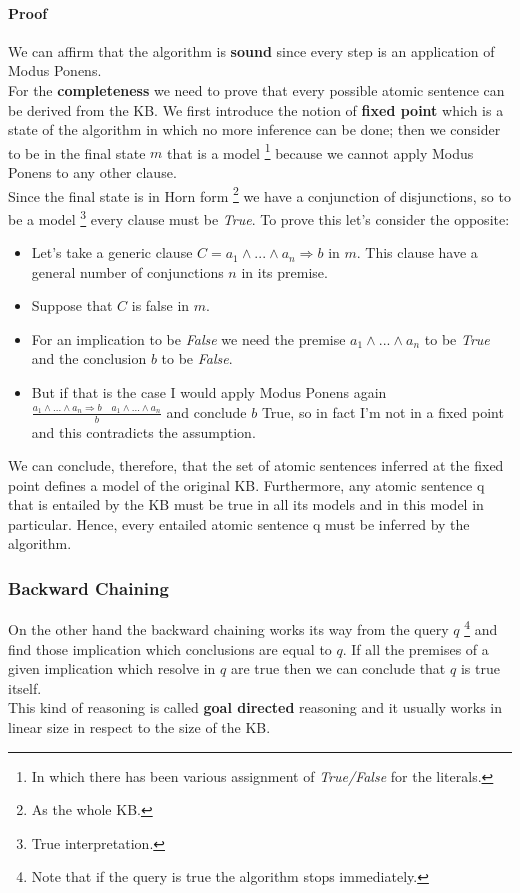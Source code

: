 \documentclass[10pt,a4paper]{article}
\begin{document}
\paragraph{Proof}
We can affirm that the algorithm is \textbf{sound} since every step is an application of Modus Ponens.\\
For the \textbf{completeness} we need to prove that every possible atomic sentence can be derived from the KB. We first introduce the notion of \textbf{fixed point} which is a state of the algorithm in which no more inference can be done; then we consider to be in the final state $m$ that is a model \footnote{In which there has been various assignment of \textit{True/False} for the literals.} because we cannot apply Modus Ponens to any other clause.\\
Since the final state is in Horn form \footnote{As the whole KB.} we have a conjunction of disjunctions, so to be a model \footnote{True interpretation.} every clause must be \textit{True}. To prove this let's consider the opposite:
\begin{itemize}
\item Let's take a generic clause $C=a_1\wedge...\wedge a_n\Rightarrow b$ in $m$. This clause have a general number of conjunctions $n$ in its premise.
\item Suppose that $C$ is false in $m$.
\item For an implication to be \textit{False} we need the premise $a_1\wedge...\wedge a_n$ to be \textit{True} and the conclusion $b$ to be \textit{False}.
\item But if that is the case I would apply Modus Ponens again $\frac{a_1\wedge...\wedge a_n\Rightarrow b\quad a_1\wedge...\wedge a_n}{b}$ and conclude $b$ True, so in fact I'm not in a fixed point and this contradicts the assumption.
\end{itemize}


We can conclude, therefore, that the set of atomic sentences inferred at the fixed point defines a model of the original KB. Furthermore, any atomic sentence q that is entailed by the KB must be true in all its models and in this model in particular. Hence, every entailed atomic sentence q must be inferred by the algorithm.

\subsubsection{Backward Chaining}
On the other hand the backward chaining works its way from the query $q$ \footnote{Note that if the query is true the algorithm stops immediately.} and find those implication which conclusions are equal to $q$. If all the premises of a given implication which resolve in $q$ are true then we can conclude that $q$ is true itself.\\
This kind of reasoning is called \textbf{goal directed} reasoning and it usually works in linear size in respect to the size of the KB.
\end{document}
